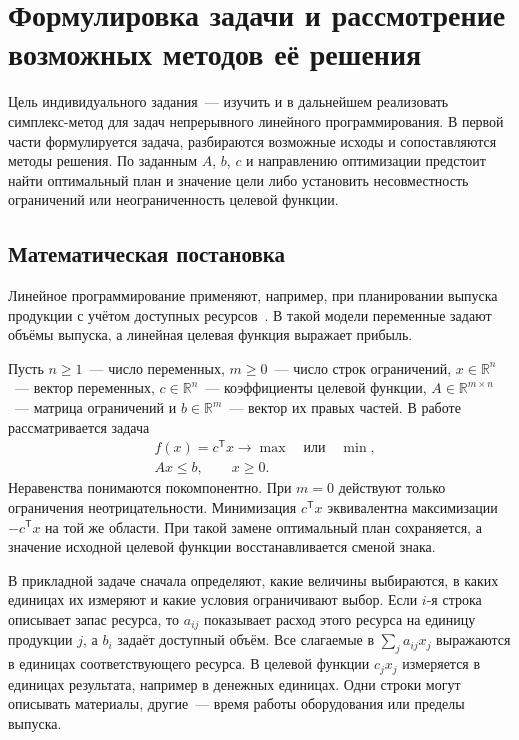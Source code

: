 \section{Формулировка задачи и рассмотрение возможных методов её решения}
\label{sec:problem}

Цель индивидуального задания~--- изучить и в дальнейшем реализовать
симплекс-метод для задач непрерывного линейного программирования.
В первой части формулируется задача, разбираются возможные исходы и
сопоставляются методы решения. По заданным $A$, $b$, $c$ и направлению
оптимизации предстоит найти оптимальный план и значение цели либо установить
несовместность ограничений или неограниченность целевой функции.

\subsection{Математическая постановка}

Линейное программирование применяют, например, при планировании
выпуска продукции с учётом доступных ресурсов~\cite{vanderbei2020,boyd2004}.
В такой модели переменные задают объёмы выпуска, а линейная целевая
функция выражает прибыль.

Пусть $n \ge 1$~--- число переменных, $m \ge 0$~--- число строк
ограничений, $x \in \mathbb{R}^{n}$~--- вектор переменных,
$c \in \mathbb{R}^{n}$~--- коэффициенты целевой функции,
$A \in \mathbb{R}^{m \times n}$~--- матрица ограничений и
$b \in \mathbb{R}^{m}$~--- вектор их правых частей. В работе рассматривается
задача
\begin{equation}
  \begin{aligned}
    &f(x)=c^{\mathsf T}x \longrightarrow \max
      \quad\text{или}\quad \min,\\
    &Ax\le b,\qquad x\ge 0.
  \end{aligned}
  \label{eq:lp-model}
\end{equation}
Неравенства понимаются покомпонентно. При $m=0$ действуют только ограничения
неотрицательности. Минимизация $c^{\mathsf T}x$ эквивалентна максимизации
$-c^{\mathsf T}x$ на той же области. При такой замене оптимальный план
сохраняется, а значение исходной целевой функции восстанавливается
сменой знака.

В прикладной задаче сначала определяют, какие величины выбираются,
в каких единицах их измеряют и какие условия ограничивают выбор.
Если $i$-я строка описывает запас ресурса, то $a_{ij}$ показывает расход
этого ресурса на единицу продукции $j$, а $b_i$ задаёт доступный объём.
Все слагаемые в $\sum_j a_{ij}x_j$ выражаются в единицах соответствующего
ресурса. В целевой функции $c_jx_j$ измеряется в единицах результата,
например в денежных единицах. Одни строки могут описывать материалы,
другие~--- время работы оборудования или пределы выпуска.

